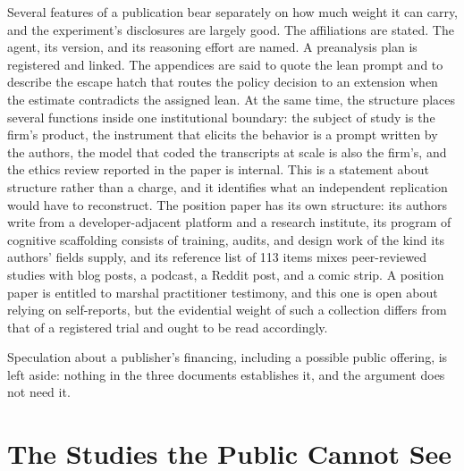 \documentclass[11pt]{article}
\begin{document}
Several features of a publication bear separately on how much weight it can carry, and the experiment's disclosures are largely good. The affiliations are stated. The agent, its version, and its reasoning effort are named. A preanalysis plan is registered and linked. The appendices are said to quote the lean prompt and to describe the escape hatch that routes the policy decision to an extension when the estimate contradicts the assigned lean. At the same time, the structure places several functions inside one institutional boundary: the subject of study is the firm's product, the instrument that elicits the behavior is a prompt written by the authors, the model that coded the transcripts at scale is also the firm's, and the ethics review reported in the paper is internal. This is a statement about structure rather than a charge, and it identifies what an independent replication would have to reconstruct. The position paper has its own structure: its authors write from a developer-adjacent platform and a research institute, its program of cognitive scaffolding consists of training, audits, and design work of the kind its authors' fields supply, and its reference list of 113 items mixes peer-reviewed studies with blog posts, a podcast, a Reddit post, and a comic strip. A position paper is entitled to marshal practitioner testimony, and this one is open about relying on self-reports, but the evidential weight of such a collection differs from that of a registered trial and ought to be read accordingly.

Speculation about a publisher's financing, including a possible public offering, is left aside: nothing in the three documents establishes it, and the argument does not need it.

\section{The Studies the Public Cannot See}
\end{document}
